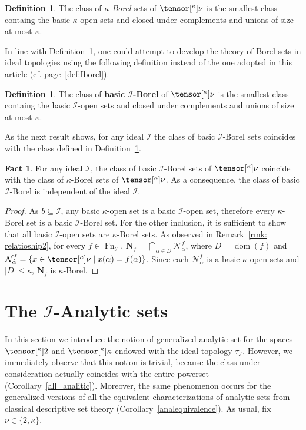 \documentclass{amsart}
\numberwithin{equation}{section}
\newcommand{\I}{\mathcal{I}}
\newcommand{\N}{\mathcal{N}}
\newcommand{\pre}[2]{\tensor[^{#1}]{#2}{}}
\newcommand{\Nbhd}{\boldsymbol{N}}
\newcommand{\markdef}[1]{\textbf{#1}}
\newcommand{\1}{\mathbf{I}}
\newcommand{\2}{\mathbf{II}}
\renewcommand{\a}{\alpha}
\renewcommand{\k}{\kappa}
\DeclareMathOperator{\dom}{dom}
\DeclareMathOperator{\Fn}{Fn}
\newcommand{\clopen}[1]{\Nbhd_{#1}}
\theoremstyle{definition}
\newtheorem{definition}[theorem]{Definition}
\newtheorem{fact}[theorem]{Fact}
\theoremstyle{remark}
\begin{document}
\begin{definition}\label{def_borel_HMV}
 The class of \emph{$\k$-Borel} sets of \(\pre{\k}{\nu}\)  is the smallest class containg the basic $\k$-open sets and closed under complements and unions of size at most $\k$.
\end{definition}
In line with Definition~\ref{def_borel_HMV}, one could attempt to develop the theory of Borel sets in ideal topologies using the following definition instead of the one adopted in this article (cf. page~\ref{def:Iborel}). 

\begin{definition}\label{def_borel_basic}
    The class of \markdef{basic $\I$-Borel} of \(\pre{\k}{\nu}\) is the smallest class containg the basic $\I$-open sets and closed under complements and unions of size at most $\k$.
\end{definition}

As the next result shows, for any ideal \(\I\) the class of basic \(\I\)-Borel sets coincides with the class defined in Definition~\ref{def_borel_HMV}. 



\begin{fact}
    For any ideal $\I$, the class of basic $\I$-Borel sets  of \(\pre{\k}{\nu}\) coincide with the class of $\k$-Borel sets  of \(\pre{\k}{\nu}\). As a consequence, the class of basic $\I$-Borel is independent of the ideal $\I$.
\end{fact}
\begin{proof}
As \(b \subseteq \I\), any basic $\k$-open set is a basic $\I$-open set, therefore every $\k$-Borel set is a basic $\I$-Borel set. 
For the other inclusion, it is sufficient to show that all basic $\I$-open sets are $\k$-Borel sets. As observed in Remark~\ref{rmk: relatioship2}, for every \(f \in \Fn_\I\), \(\clopen{f}=\bigcap_{\a \in D} \N^f_\a\), where  $D =\dom(f)$ and \(\N^f_\a=\{x \in \pre{\k}{\nu} \mid x(\a)=f(\a)\}\). Since each \(\N^f_\a\) is a basic \(\k\)-open sets and \(|D|\leq \k\), \(\clopen{f}\) is \(\k\)-Borel.
\end{proof}




\section{The \(\I\)-Analytic sets}\label{section_analytic}

In this section we introduce the notion of generalized analytic set for the spaces \(\pre{\k}{2}\) and \(\pre{\k}{\k}\) endowed with the ideal topology \(\tau_\I\). However, we immediately observe that this notion is trivial, because the class under consideration actually coincides with the entire powerset (Corollary~\ref{all_analitic}). Moreover, the same phenomenon occurs for the generalized versions of all the equivalent characterizations of analytic sets from classical descriptive set theory (Corollary~\ref{analequivalence}). As usual, fix \(\nu\in \{2,\k\}\).
\end{document}

